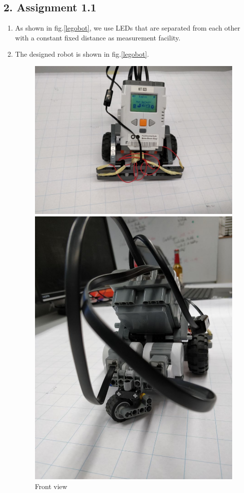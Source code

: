\documentclass[11pt,a4paper,openright,twoside]{extreport}
\begin{document}
\subsection*{2. Assignment 1.1}
\begin{enumerate}
\item As shown in fig.\ref{legobot}, we use LEDs that are separated from each other with a constant fixed distance as measurement facility.
\item The designed robot is shown in fig.\ref{legobot}.
\begin{figure}[ht]
  \begin{minipage}[b]{0.5\textwidth}
    \centering
    \includegraphics[width=.9\textwidth]{front.jpeg}
    \captionsetup{labelformat=empty}
    \caption{Front view} 
    \vspace{4ex}
  \end{minipage}%
  \begin{minipage}[b]{0.5\textwidth}
    \centering
    \includegraphics[width=.6\textwidth]{back.jpeg}

\end{minipage}
\end{figure}
\end{enumerate}
\end{document}
